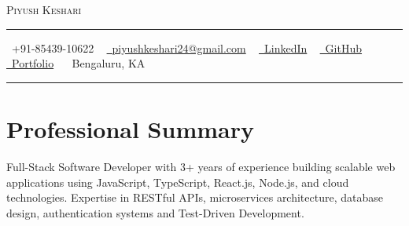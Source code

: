 \documentclass[letterpaper,11pt]{article}
\begin{document}
\begin{center}
    {\Huge \scshape \color{primarycolor} Piyush Keshari} \\ \vspace{3pt}
    {\color{accentcolor} \hrule height 1pt} \vspace{3pt}
    \small \raisebox{-0.1\height}\faPhone\ +91-85439-10622 ~ 
    \href{mailto:piyushkeshari24@gmail.com}{\raisebox{-0.2\height}\faEnvelope\  piyushkeshari24@gmail.com} ~ 
    \href{https://linkedin.com/in/piyush-k-ba3a67134}{\raisebox{-0.2\height}\faLinkedin\ LinkedIn} ~
    \href{https://github.com/KeshariPiyush24}{\raisebox{-0.2\height}\faGithub\ GitHub} ~
    \href{https://kesharipiyush24.github.io/}{\raisebox{-0.2\height}\faGlobe\ Portfolio} ~
    \raisebox{-0.1\height}\faMapMarker\ Bengaluru, KA \\
    \vspace{2pt}
    {\color{accentcolor} \hrule height 0.5pt}
    \vspace{-8pt}
\end{center}

\section{Professional Summary}
\small{Full-Stack Software Developer with 3+ years of experience building scalable web applications using JavaScript, TypeScript, React.js, Node.js, and cloud technologies. Expertise in RESTful APIs, microservices architecture, database design, authentication systems and Test-Driven Development.}

\end{document}
